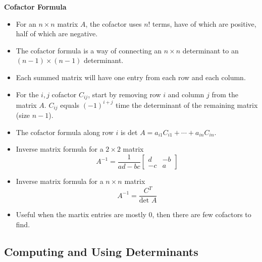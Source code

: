 \documentclass[11pt]{article}
\begin{document}
\textbf{Cofactor Formula}
\begin{itemize}
    \item For an $n \times n$ matrix $A$, the cofactor uses $n$! terms, have of which are 
    positive, half of which are negative. 
    \item The cofactor formula is a way of connecting an $n \times n$ determinant to an 
    $(n-1) \times (n-1)$ determinant.
    \item Each summed matrix will have one entry from each row and each column.
    \item For the $i,j$ cofactor $C_{ij}$, start by removing row $i$ and column $j$ from the 
    matrix $A$. $C_{ij}$ equals ${(-1)}^{i+j}$ time the determinant of the remaining matrix 
    (size $n-1$).
    \item The cofactor formula along row $i$ is det $A = a_{i1}C_{i1} + \cdots + a_{in}C_{in}$.
    \item Inverse matrix formula for a $2 \times 2$ matrix 
    \[ A^{-1} = \frac{1}{ad - bc} 
    \begin{bmatrix}
        d & -b \\
        -c & a 
    \end{bmatrix} \]
    \item Inverse matrix formula for a $n \times n$ matrix 
    \[A^{-1} = \frac{C^T}{\text{det }A}\]
    \item Useful when the martix entries are mostly 0, then there are few cofactors to 
    find.
\end{itemize}

\subsection{Computing and Using Determinants}
\end{document}
